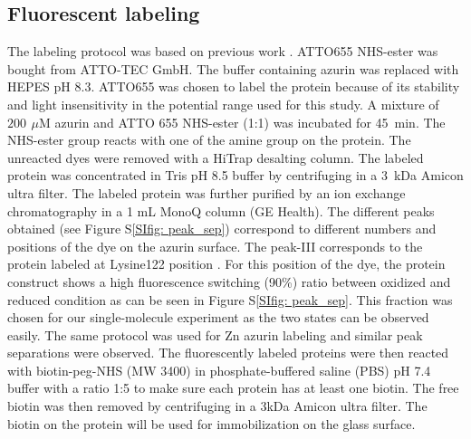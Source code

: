 \documentclass[journal=jacsat,manuscript=article]{achemso}
\newcommand{\uM}{\ensuremath{\,\mu\textrm{M}}}
\begin{document}
\subsection{Fluorescent labeling}
The labeling protocol was based on previous work \cite{nicolardi2012topdown}. ATTO655 NHS-ester was bought from ATTO-TEC GmbH. The buffer containing azurin was replaced with HEPES pH 8.3. ATTO655 was chosen to label the protein because of its stability and light insensitivity in the potential range used for this study. A mixture of $200~\uM$ azurin and ATTO 655 NHS-ester (1:1) was incubated for 45~min. The NHS-ester group reacts with one of the amine group on the protein. The unreacted dyes were removed with a HiTrap desalting column. The labeled protein was concentrated in Tris pH 8.5 buffer by centrifuging in a 3~kDa Amicon ultra filter. The labeled protein was further purified by an ion exchange chromatography in a 1 mL MonoQ column (GE Health). The different peaks obtained (see Figure S\ref{SIfig: peak_sep}) correspond to different numbers and positions of the dye on the azurin surface. The peak-III corresponds to the protein labeled at Lysine122 position \cite{nicolardi2012topdown}. For this position of the dye, the protein construct shows a high fluorescence switching (90\%) ratio between oxidized and reduced condition as can be seen in Figure S\ref{SIfig: peak_sep}. This fraction was chosen for our single-molecule experiment as the two states can be observed easily. The same protocol was used for Zn azurin labeling and similar peak separations were observed. The fluorescently labeled proteins were then reacted with biotin-peg-NHS (MW 3400) in phosphate-buffered saline (PBS) pH 7.4 buffer with a ratio 1:5 to make sure each protein has at least one biotin. The free biotin was then removed by centrifuging in a 3kDa Amicon ultra filter. The biotin on the protein will be used for immobilization on the glass surface.
\end{document}
